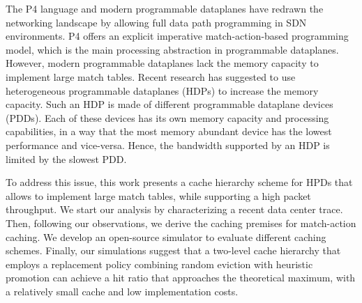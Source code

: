 The P4 language and modern programmable dataplanes have redrawn the networking landscape by allowing full data path programming in SDN environments.
P4 offers an explicit imperative match-action-based programming model, which is the main processing abstraction in programmable dataplanes.
However, modern programmable dataplanes lack the memory capacity to implement large match tables.
Recent research has suggested to use heterogeneous programmable dataplanes (HDPs) to increase the memory capacity. 
Such an HDP is made of different programmable dataplane devices (PDDs).
Each of these devices has its own memory capacity and processing capabilities, in a way that the most memory abundant device has the lowest performance and vice-versa.
Hence, the bandwidth supported by an HDP is limited by the slowest PDD.

To address this issue, this work presents a cache hierarchy scheme for HPDs that allows to implement large match tables, while supporting a high packet throughput. 
We start our analysis by characterizing a recent data center trace.
Then, following our observations, we derive the caching premises for match-action caching.
We develop an open-source simulator to evaluate different caching schemes.
Finally, our simulations suggest that a two-level cache hierarchy that employs a replacement policy combining random eviction with heuristic promotion can achieve a hit ratio that approaches the theoretical maximum, with a relatively small cache and low implementation costs.